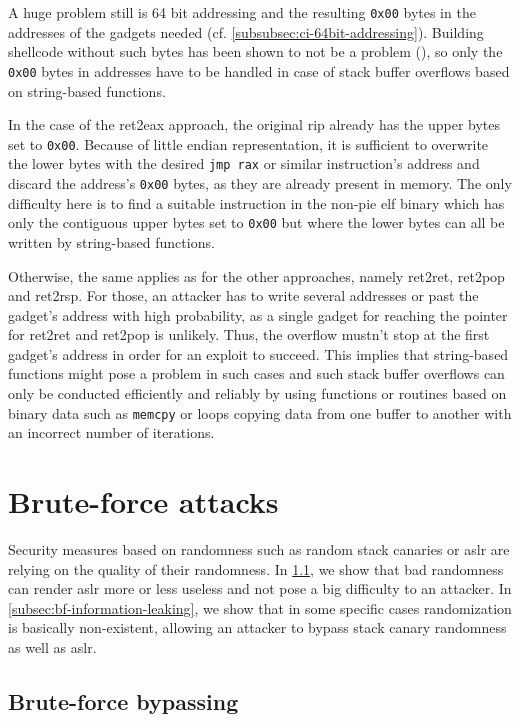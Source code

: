 A huge problem still is 64 bit addressing and the resulting \texttt{0x00} bytes in the addresses of the gadgets needed (cf. \cref{subsubsec:ci-64bit-addressing}).
Building shellcode without such bytes has been shown to not be a problem (\cites[290\psqq]{Erickson2008}{Mason2009}{obscou2003}), so only the \texttt{0x00} bytes in addresses have to be handled in case of stack buffer overflows based on string-based functions.

In the case of the ret2eax approach, the original \gls{rip} already has the upper bytes set to \texttt{0x00}.
Because of little endian representation, it is sufficient to overwrite the lower bytes with the desired \texttt{jmp rax} or similar instruction's address and discard the address's \texttt{0x00} bytes, as they are already present in memory.
The only difficulty here is to find a suitable instruction in the non-\acs{pie} \gls{elf} binary which has only the contiguous upper bytes set to \texttt{0x00} but where the lower bytes can all be written by string-based functions.

Otherwise, the same applies as for the other approaches, namely ret2ret, ret2pop and ret2rsp.
For those, an attacker has to write several addresses or past the gadget's address with high probability, as a single gadget for reaching the pointer for ret2ret and ret2pop is unlikely.
Thus, the overflow mustn't stop at the first gadget's address in order for an exploit to succeed.
This implies that string-based functions might pose a problem in such cases and such stack buffer overflows can only be conducted efficiently and reliably by using functions or routines based on binary data such as \texttt{memcpy} or loops copying data from one buffer to another with an incorrect number of iterations.

\section{Brute-force attacks}
\label{sec:brute-force}

Security measures based on randomness such as random stack canaries or \gls{aslr} are relying on the quality of their randomness.
In \cref{subsec:bf-aslr}, we show that bad randomness can render \gls{aslr} more or less useless and not pose a big difficulty to an attacker.
In \cref{subsec:bf-information-leaking}, we show that in some specific cases randomization is basically non-existent, allowing an attacker to bypass stack canary randomness as well as \gls{aslr}.

\subsection{Brute-force  bypassing}
\label{subsec:bf-aslr}


